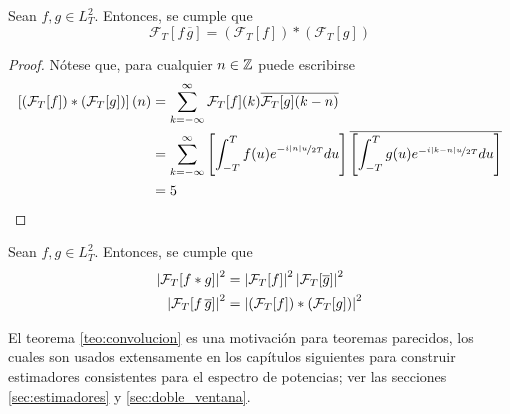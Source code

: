 \begin{teorema}
Sean $f, g \in L^{2}_T$. Entonces, se cumple que
\begin{equation}
\mathcal{F}_T[ f\, \overline{g}] = \left( \mathcal{F}_T[f] \right) \ast \left( \mathcal{F}_T[g] \right)
\end{equation}
\end{teorema}

\begin{proof}
Nótese que, para cualquier $n \in \mathbb{Z}$ puede escribirse
\begin{align*}
\left[\left( \mathcal{F}_T[f] \right) \ast \left( \mathcal{F}_T[g] \right)\right](n)
&=
\sum_{k=-\infty}^{\infty} \mathcal{F}_T[f](k) \overline{\mathcal{F}_T[g](k-n)} \\
&=
\sum_{k=-\infty}^{\infty} \left[ \int_{- T }^{ T } f(u) e^{-\nicefrac{ i \left| n \right| u}{2T}} du \right] \overline{\left[ \int_{- T }^{ T } g(u) e^{-\nicefrac{ i \left| k-n \right| u}{2T}} du \right]} \\
&= 5
\end{align*}
\end{proof}

\begin{corolario}
Sean $f, g \in L^{2}_T$. Entonces, se cumple que
\begin{align}
\left| \mathcal{F}_T[f \ast g] \right|^{2} &= \left|  \mathcal{F}_T[f]  \right|^{2} \left|  \mathcal{F}_T[\overline{g}]  \right|^{2} \\
\left| \mathcal{F}_T[ f\, \overline{g}] \right|^{2} &= \left|  \left( \mathcal{F}_T[f] \right) \ast \left( \mathcal{F}_T[g] \right) \right|^{2}
\end{align}
\label{teo:convolucion}
\end{corolario}

El teorema \ref{teo:convolucion} es una motivación para teoremas parecidos, los cuales son usados extensamente en los capítulos siguientes para construir estimadores consistentes para el espectro de potencias; ver las secciones \ref{sec:estimadores} y \ref{sec:doble_ventana}.
%


%

